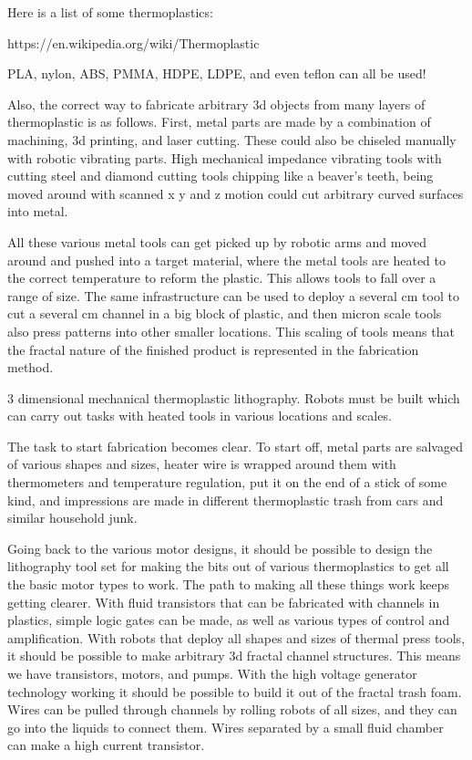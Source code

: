 Here is a list of some thermoplastics:

https://en.wikipedia.org/wiki/Thermoplastic

PLA, nylon, ABS, PMMA, HDPE, LDPE, and even teflon can all be used!

Also, the correct way to fabricate arbitrary 3d objects from many layers
of thermoplastic is as follows. First, metal parts are made by a
combination of machining, 3d printing, and laser cutting. These could
also be chiseled manually with robotic vibrating parts. High mechanical
impedance vibrating tools with cutting steel and diamond cutting tools
chipping like a beaver's teeth, being moved around with scanned x y and
z motion could cut arbitrary curved surfaces into metal.

All these various metal tools can get picked up by robotic arms and
moved around and pushed into a target material, where the metal tools
are heated to the correct temperature to reform the plastic. This allows
tools to fall over a range of size. The same infrastructure can be used
to deploy a several cm tool to cut a several cm channel in a big block
of plastic, and then micron scale tools also press patterns into other
smaller locations. This scaling of tools means that the fractal nature
of the finished product is represented in the fabrication method.

3 dimensional mechanical thermoplastic lithography. Robots must be built
which can carry out tasks with heated tools in various locations and
scales.

The task to start fabrication becomes clear. To start off, metal parts
are salvaged of various shapes and sizes, heater wire is wrapped around
them with thermometers and temperature regulation, put it on the end of
a stick of some kind, and impressions are made in different
thermoplastic trash from cars and similar household junk.

Going back to the various motor designs, it should be possible to design
the lithography tool set for making the bits out of various
thermoplastics to get all the basic motor types to work. The path to
making all these things work keeps getting clearer. With fluid
transistors that can be fabricated with channels in plastics, simple
logic gates can be made, as well as various types of control and
amplification. With robots that deploy all shapes and sizes of thermal
press tools, it should be possible to make arbitrary 3d fractal channel
structures. This means we have transistors, motors, and pumps. With the
high voltage generator technology working it should be possible to build
it out of the fractal trash foam. Wires can be pulled through channels
by rolling robots of all sizes, and they can go into the liquids to
connect them. Wires separated by a small fluid chamber can make a high
current transistor.

